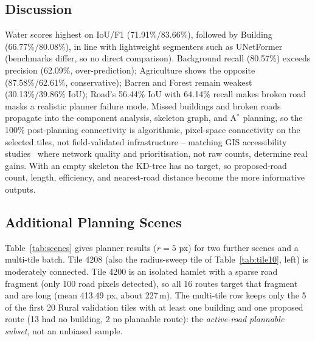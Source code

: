 \documentclass[runningheads]{llncs}
\begin{document}
\subsection{Discussion}
Water scores highest on IoU/F1 (71.91\%/83.66\%), followed by Building (66.77\%/80.08\%), in line with lightweight segmenters such as UNetFormer~\cite{wang2022unet} (benchmarks differ, so no direct comparison). Background recall (80.57\%) exceeds precision (62.09\%, over-prediction); Agriculture shows the opposite (87.58\%/62.61\%, conservative); Barren and Forest remain weakest (30.13\%/39.86\% IoU); Road's 56.44\% IoU with 64.14\% recall makes broken road masks a realistic planner failure mode. Missed buildings and broken roads propagate into the component analysis, skeleton graph, and A$^{*}$ planning, so the 100\% post-planning connectivity is algorithmic, pixel-space connectivity on the selected tiles, not field-validated infrastructure -- matching GIS accessibility studies~\cite{verma2020,kapoor2021} where network quality and prioritisation, not raw counts, determine real gains. With an empty skeleton the KD-tree has no target, so proposed-road count, length, efficiency, and nearest-road distance become the more informative outputs.

\subsection{Additional Planning Scenes}\label{sec:scenes}
Table~\ref{tab:scenes} gives planner results ($r=5$ px) for two further scenes and a multi-tile batch. Tile 4208 (also the radius-sweep tile of Table~\ref{tab:tile10}, left) is moderately connected. Tile 4200 is an isolated hamlet with a sparse road fragment (only 100 road pixels detected), so all 16 routes target that fragment and are long (mean 413.49 px, about 227\,m). The multi-tile row keeps only the 5 of the first 20 Rural validation tiles with at least one building and one proposed route (13 had no building, 2 no plannable route): the \emph{active-road plannable subset}, not an unbiased sample.

\begin{table}[!htbp]
\caption{Additional planning scenes ($r=5$ px). Multi-tile row: active-road plannable subset (5 of the first 20 Rural validation tiles), per-tile means.}\label{tab:scenes}
\centering
{}
\end{table}
\end{document}
